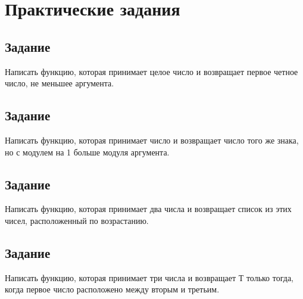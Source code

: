 \section{Практические задания}

\subsection{Задание }

Написать функцию, которая принимает целое число и возвращает первое четное число, не меньшее аргумента.



\subsection{Задание }


Написать функцию, которая принимает число и возвращает число того же знака, но с модулем на 1 больше модуля аргумента.


\subsection{Задание }

 Написать функцию, которая принимает два числа и возвращает список из этих чисел, расположенный по возрастанию.
 
 

\subsection{Задание }

Написать функцию, которая принимает три числа и возвращает Т только тогда, когда первое число расположено между вторым и третьим.

